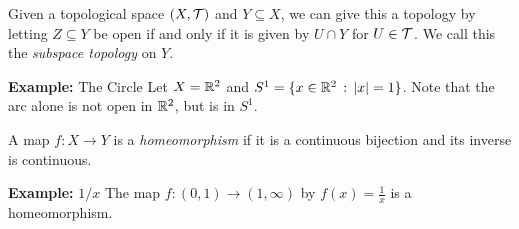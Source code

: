 Given a topological space $(X, \cal{T})$ and $Y \subseteq X$, we can give this a topology by letting $Z \subseteq Y$ be open if and only if it is given by $U \cap Y$ for $U \in \cal{T}$. We call this the \emph{subspace topology} on $Y$.

\begin{example}{\textbf{Example:} The Circle}
    Let $X = \R^2$ and $S^1 = \{x \in \R^2 \col \abs{x} = 1\}$.
    Note that the arc alone is not open in $\R^2$, but is in $S^1$.
\end{example}

\begin{definition}
    A map $f : X \to Y$ is a \emph{homeomorphism} if it is a continuous bijection and its inverse is continuous.
\end{definition}

\begin{example}{\textbf{Example:} $1/x$}
    The map $f : (0, 1) \to (1, \infty)$ by $f(x) = \frac{1}{x}$ is a homeomorphism.
\end{example}
